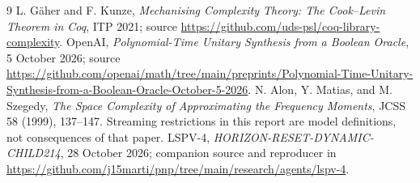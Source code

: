 \documentclass[11pt]{article}
\begin{document}
\begin{thebibliography}{9}
 L. G\"aher and F. Kunze,
\emph{Mechanising Complexity Theory: The Cook--Levin Theorem in Coq},
ITP 2021; source \url{https://github.com/uds-psl/coq-library-complexity}.
 OpenAI, \emph{Polynomial-Time Unitary Synthesis from a Boolean Oracle},
5 October 2026; source \url{https://github.com/openai/math/tree/main/preprints/Polynomial-Time-Unitary-Synthesis-from-a-Boolean-Oracle-October-5-2026}.
 N. Alon, Y. Matias, and M. Szegedy,
\emph{The Space Complexity of Approximating the Frequency Moments},
JCSS 58 (1999), 137--147.  Streaming restrictions in this report are
model definitions, not consequences of that paper.
 LSPV-4, \emph{HORIZON-RESET-DYNAMIC-CHILD214},
28 October 2026; companion source and reproducer in
\url{https://github.com/j15marti/pnp/tree/main/research/agents/lspv-4}.
\end{thebibliography}
\end{document}
